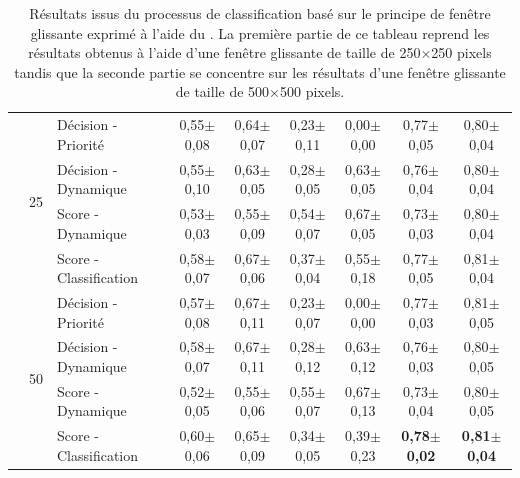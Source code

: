 \begin{landscape}
\begin{table}[]
\begin{tabular}{lllcccccc}
							        & \multirow{4}{*}{25}           & Décision - Priorité       & 0,55$\pm$0,08         & 0,64$\pm$0,07     & 0,23$\pm$0,11         & 0,00$\pm$0,00     & 0,77$\pm$0,05         & 0,80$\pm$0,04         \\
							        &                               & Décision - Dynamique      & 0,55$\pm$0,10         & 0,63$\pm$0,05     & 0,28$\pm$0,05         & 0,63$\pm$0,05     & 0,76$\pm$0,04         & 0,80$\pm$0,04         \\
							        &                               & Score - Dynamique         & 0,53$\pm$0,03         & 0,55$\pm$0,09     & 0,54$\pm$0,07         & 0,67$\pm$0,05     & 0,73$\pm$0,03         & 0,80$\pm$0,04         \\
							        &                               & Score - Classification    & 0,58$\pm$0,07         & 0,67$\pm$0,06     & 0,37$\pm$0,04         & 0,55$\pm$0,18     & 0,77$\pm$0,05         & 0,81$\pm$0,04         \\ \cline{2-9}
							        & \multirow{4}{*}{50}           & Décision - Priorité       & 0,57$\pm$0,08         & 0,67$\pm$0,11     & 0,23$\pm$0,07         & 0,00$\pm$0,00     & 0,77$\pm$0,03         & 0,81$\pm$0,05         \\
							        &                               & Décision - Dynamique      & 0,58$\pm$0,07         & 0,67$\pm$0,11     & 0,28$\pm$0,12         & 0,63$\pm$0,12     & 0,76$\pm$0,03         & 0,80$\pm$0,05         \\
							        &                               & Score - Dynamique         & 0,52$\pm$0,05         & 0,55$\pm$0,06     & 0,55$\pm$0,07         & 0,67$\pm$0,13     & 0,73$\pm$0,04         & 0,80$\pm$0,05         \\ \rowcolor[HTML]{E7E6E6}
		                            &                               & Score - Classification    & 0,60$\pm$0,06         & 0,65$\pm$0,09     & 0,34$\pm$0,05         & 0,39$\pm$0,23     & \textbf{0,78$\pm$0,02}& \textbf{0,81$\pm$0,04}\\
		\bottomrule
    \end{tabular}
    \caption{Résultats issus du processus de classification basé sur le principe de fenêtre glissante exprimé à l'aide du \fscore. La première partie de ce tableau reprend les résultats obtenus à l'aide d'une fenêtre glissante de taille de 250$\times$250 pixels tandis que la seconde partie se concentre sur les résultats d'une fenêtre glissante de taille de 500$\times$500 pixels.}
    \label{tab:results_image_improvement_sliding_window}
\end{table}
\end{landscape}

